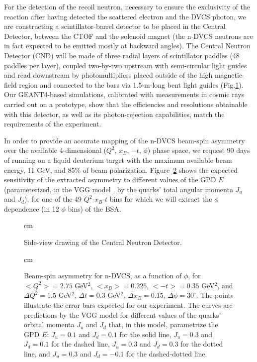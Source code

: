 \documentclass[12pt,oneside]{article}
\begin{document}
{For the detection of the recoil neutron, necessary to ensure the exclusivity of the reaction after having detected the scattered electron and the DVCS photon, we are constructing a scintillator-barrel detector to be placed in the Central Detector, between the CTOF and the solenoid magnet (the n-DVCS neutrons are in fact expected to be emitted mostly at backward angles). The Central Neutron Detector (CND) will be made of three radial layers of scintillator paddles (48 paddles per layer), coupled two-by-two upstream with semi-circular light guides and read downstream by photomultipliers placed outside of the high magnetic-field region and connected to the bars via 1.5-m-long bent light guides (Fig.\ref{side_view}). Our GEANT4-based simulations, calibrated with measurements in cosmic rays carried out on a prototype, show that the efficiencies and resolutions obtainable with this detector, as well as its photon-rejection capabilities, match the requirements of the experiment. 

In order to provide an accurate mapping of the n-DVCS beam-spin asymmetry over the available 4-dimensional ($Q^2$, $x_B$, $-t$, $\phi$) phase space, we request 90 days of running on a liquid deuterium target with the maximum available beam energy, 11 GeV, and 85\% of beam polarization. Figure~\ref{asym} shows the expected sensitivity of the extracted asymmetry to different values of the GPD $E$ (parameterized, in the VGG model \cite{VGG}, by the quarks' total angular momenta $J_u$ and  $J_d$), for one of the 49 $Q^2$-$x_B$-$t$ bins for which we will extract the $\phi$ dependence (in 12 $\phi$ bins) of the BSA. 

\begin{figure}[h]  
\begin{center}
 cm
\caption{Side-view drawing of the Central Neutron Detector.}
\label{side_view}
\end{center}
\end{figure}

\begin{figure}[h]  
\begin{center}
 cm
\caption{Beam-spin asymmetry for n-DVCS, as a function of $\phi$, for $<Q^2>=2.75$ GeV$^2$, $<x_B>=0.225$, $<-t>=0.35$  GeV$^2$, and $\Delta Q^2=1.5$ GeV$^2$, $\Delta t=0.3$ GeV$^2$, $\Delta x_B=0.15$, $\Delta\phi=30^{\circ}$. The points illustrate the error bars expected for our experiment. The curves are predictions by the VGG model \cite{VGG} for different values of the quarks' orbital momenta $J_u$ and $J_d$ that, in this model, parametrize the GPD $E$: $J_u=0.1$ and $J_d=0.1$ for the solid line, $J_u=0.3$ and $J_d=0.1$ for the dashed line, $J_u=0.3$ and $J_d=0.3$ for the dotted line, and  $J_u=0.3$ and $J_d=-0.1$ for the dashed-dotted line.}
\label{asym}
\end{center}
\end{figure}

}
\end{document}
